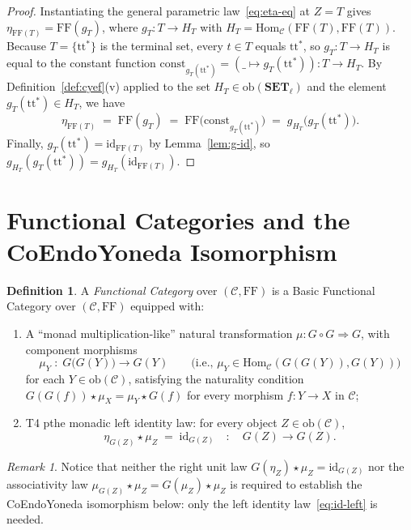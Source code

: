 \documentclass[11pt,a4paper]{article}
\theoremstyle{definition}
\newtheorem{definition}[theorem]{Definition}
\theoremstyle{remark}
\newtheorem{remark}[theorem]{Remark}
\newcommand{\Set}{\mathbf{SET}}
\newcommand{\Hom}{\mathrm{Hom}}
\newcommand{\id}{\mathrm{id}}
\newcommand{\FF}{\mathrm{FF}}
\newcommand{\ttstar}{\mathrm{tt}^*}
\newcommand{\const}{\mathrm{const}}
\begin{document}
\begin{proof}
Instantiating the general parametric law~\eqref{eq:eta-eq} at $Z = T$ gives
$\eta_{\FF(T)} = \FF(g_T)$, where $g_T : T \to H_T$ with $H_T = \Hom_{\mathcal{C}}(\FF(T), \FF(T))$.
Because $T = \{\ttstar\}$ is the terminal set, every $t \in T$ equals $\ttstar$, so $g_T : T \to H_T$
is equal to the constant function $\const_{g_T(\ttstar)} = (\_ \mapsto g_T(\ttstar)) : T \to H_T$. By
Definition~\ref{def:cyef}(v) applied to the set $H_T \in \mathrm{ob}(\Set_\ell)$ and the element
$g_T(\ttstar) \in H_T$, we have
\[
  \eta_{\FF(T)} \;=\; \FF(g_T) \;=\; \FF\bigl(\const_{g_T(\ttstar)}\bigr) \;=\; g_{H_T}\bigl(g_T(\ttstar)\bigr).
\]
Finally, $g_T(\ttstar) = \id_{\FF(T)}$ by Lemma~\ref{lem:g-id}, so
$g_{H_T}(g_T(\ttstar)) = g_{H_T}(\id_{\FF(T)})$.
\end{proof}

\section{Functional Categories and the CoEndoYoneda Isomorphism}\label{sec:coendoyoneda}

\begin{definition}\label{def:fc}
A \emph{Functional Category} over $(\mathcal{C}, \FF)$ is a Basic Functional Category over
$(\mathcal{C}, \FF)$ equipped with:
\begin{enumerate}[label=(\roman*),nosep]
  \item A ``monad multiplication-like'' natural transformation $\mu : G \circ G \Rightarrow G$, with
  component morphisms
  \[
    \mu_Y \;:\; G\bigl(G(Y)\bigr) \longrightarrow G(Y)
    \qquad\bigl(\text{i.e., }\mu_Y \in \Hom_{\mathcal{C}}(G(G(Y)), G(Y))\bigr)
  \]
  for each $Y \in \mathrm{ob}(\mathcal{C})$, satisfying the naturality condition
  $G(G(f)) \star \mu_X = \mu_Y \star G(f)$ for every morphism $f : Y \to X$ in $\mathcal{C}$;
\vspace{4 pt}
  \item T4 pthe monadic left identity law: for every object $Z \in \mathrm{ob}(\mathcal{C})$,
  \begin{equation}\label{eq:id-left}
    \eta_{G(Z)} \star \mu_Z \;=\; \id_{G(Z)}
    \quad:\quad
    G(Z) \longrightarrow G(Z).
  \end{equation}
\end{enumerate}
\end{definition}

\begin{remark}
Notice that neither the right unit law $G(\eta_Z) \star \mu_Z = \id_{G(Z)}$ nor the associativity law
$\mu_{G(Z)} \star \mu_Z = G(\mu_Z) \star \mu_Z$ is required to establish the CoEndoYoneda isomorphism
below: only the left identity law~\eqref{eq:id-left} is needed.
\end{remark}
\end{document}
